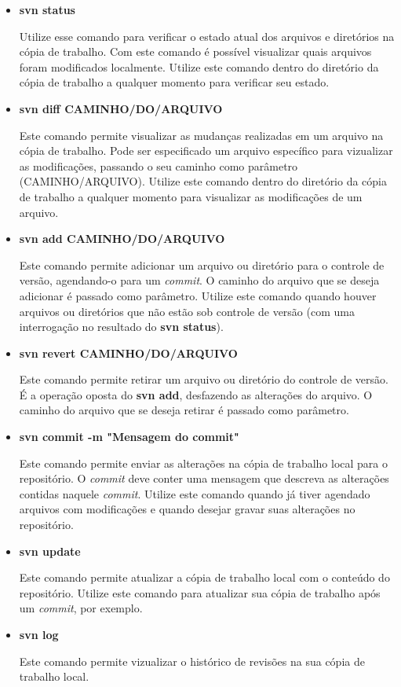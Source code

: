 \begin{itemize}
 \item 
    \textbf{svn status}
  

    \subitem Utilize esse comando para verificar o estado atual dos arquivos e diretórios na cópia de trabalho.
       Com este comando é possível visualizar quais arquivos foram modificados localmente.
       Utilize este comando dentro do diretório da cópia de trabalho a qualquer momento para verificar seu estado.


\item 
    \textbf{svn diff CAMINHO/DO/ARQUIVO}
  

    \subitem Este comando permite visualizar as mudanças realizadas em um arquivo na cópia de trabalho.
       Pode ser especificado um arquivo específico para vizualizar as modificações, passando o seu caminho como
       parâmetro (CAMINHO/ARQUIVO).
       Utilize este comando dentro do diretório da cópia de trabalho a qualquer momento para visualizar as modificações
       de um arquivo.

\item 
    \textbf{svn add CAMINHO/DO/ARQUIVO}
  

    \subitem Este comando permite adicionar um arquivo ou diretório para o controle de versão, agendando-o para um \textit{commit}.
       O caminho do arquivo que se deseja adicionar é passado como parâmetro.
       Utilize este comando quando houver arquivos ou diretórios que não estão sob controle de versão
       (com uma interrogação no resultado do \textbf{svn status}).

\item 
    \textbf{svn revert CAMINHO/DO/ARQUIVO}
  

    \subitem Este comando permite retirar um arquivo ou diretório do controle de versão.
       É a operação oposta do \textbf{svn add}, desfazendo as alterações do arquivo.
       O caminho do arquivo que se deseja retirar é passado como parâmetro.

\item 
    \textbf{svn commit -m "Mensagem do commit"}
  

    \subitem Este comando permite enviar as alterações na cópia de trabalho local para o repositório.
       O \textit{commit} deve conter uma mensagem que descreva as alterações contidas naquele \textit{commit}.
       Utilize este comando quando já tiver agendado arquivos com modificações e quando desejar
       gravar suas alterações no repositório.

\item 
    \textbf{svn update}
  

    \subitem Este comando permite atualizar a cópia de trabalho local com o conteúdo do repositório.
       Utilize este comando para atualizar sua cópia de trabalho após um \textit{commit}, por exemplo.

\item 
  \label{comando_log}
    \textbf{svn log}
  
    \subitem Este comando permite vizualizar o histórico de revisões na sua cópia de trabalho local.

\end{itemize}

